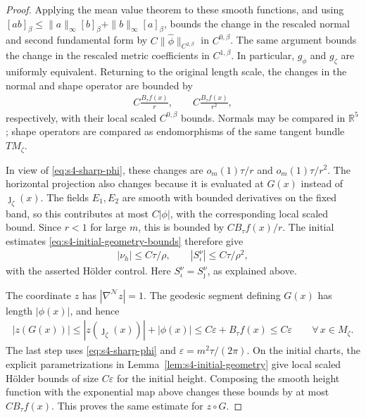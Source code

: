 \documentclass[a4paper,11pt,oneside,reqno]{amsart}
\numberwithin{equation}{section}
\theoremstyle{definition}
\begin{document}
\begin{proof}
    Applying the mean value theorem to these smooth
    functions, and using
    $[ab]_\beta\leq\|a\|_\infty[b]_\beta+
    \|b\|_\infty[a]_\beta$, bounds the change in the
    rescaled normal and second fundamental form by
    $C\|\widehat\phi\|_{C^{2,\beta}}$ in
    $C^{0,\beta}$. The same argument bounds the change
    in the rescaled metric coefficients in
    $C^{1,\beta}$. In particular, $g_\phi$ and
    $g_\zeta$ are uniformly equivalent.
    Returning to the original length scale, the changes
    in the normal and shape operator are bounded by
    \begin{align*}
        C\frac{B_\tau f(x)}r,
        \qquad
        C\frac{B_\tau f(x)}{r^2},
    \end{align*}
    respectively, with their local scaled
    $C^{0,\beta}$ bounds. Normals may be compared in
    $\mathbb R^5$; shape operators are compared as
    endomorphisms of the same tangent bundle $TM_\zeta$.

    In view of \eqref{eq:s4-sharp-phi}, these changes
    are $o_m(1)\tau/r$ and $o_m(1)\tau/r^2$.
    The horizontal projection also changes because
    it is evaluated at $G(x)$ instead of
    $\jmath_\zeta(x)$. The fields $E_1,E_2$ are
    smooth with bounded derivatives on the fixed band,
    so this contributes at most $C|\phi|$, with
    the corresponding local scaled bound.
    Since $r<1$ for large $m$, this is bounded by
    $CB_\tau f(x)/r$. The initial estimates
    \eqref{eq:s4-initial-geometry-bounds} therefore give
    \begin{align*}
        |\nu_h|\leq C\tau/\rho,
        \qquad |S_\iota^\nu|\leq C\tau/\rho^2,
    \end{align*}
    with the asserted H\"older control. Here
    $S_\iota^\nu=S_\jmath^\nu$, as explained above.

    The coordinate $z$ has $|\nabla^{\mathcal N}z|=1$.
    The geodesic segment defining $G(x)$ has length
    $|\phi(x)|$, and hence
    \begin{align*}
        |z(G(x))|
        \leq |z(\jmath_\zeta(x))|+|\phi(x)|\leq C\varepsilon+B_\tau f(x)
         \leq C\varepsilon
         \qquad\forall\,x\in M_\zeta.
    \end{align*}
    The last step uses \eqref{eq:s4-sharp-phi} and
    $\varepsilon=m^2\tau/(2\pi)$. On the initial
    charts, the explicit parametrizations in
    Lemma~\ref{lem:s4-initial-geometry} give local
    scaled H\"older bounds of size $C\varepsilon$ for
    the initial height. Composing the smooth height
    function with the exponential map above changes
    these bounds by at most $CB_\tau f(x)$.
    This proves the same estimate for $z\circ G$.


\end{proof}
\end{document}
